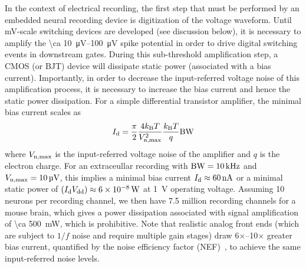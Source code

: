 In the context of electrical recording, the first step that must be performed by an embedded neural recording device is digitization of the voltage waveform.
Until \si{\milli\volt}-scale switching devices are developed (see discussion below), it is necessary to amplify the \SIrange{\ca 10}{100}{\micro\volt} spike potential in order to drive digital switching events in downstream gates.
During this sub-threshold amplification step, a CMOS (or BJT) device will dissipate static power (associated with a bias current). 
Importantly, in order to decrease the input-referred voltage noise of this amplification process, it is necessary to increase the bias current and hence the static power dissipation.
For a simple differential transistor amplifier, the minimal bias current scales as
\[I_{\text{\scriptsize d}} = \frac{\pi}{2} \frac{4k_{\text{\scriptsize B}} T}{V_{\text{\scriptsize n,max}}^2} \frac{k_{\text{\scriptsize B}} T}{q} \text{BW}\]
where $V_{\text{\scriptsize n,max}}$ is the input-referred voltage noise of the amplifier and $q$ is the electron charge.
For an extraceullar recording with $\text{BW} = \SI{10}{\kilo\hertz}$ and $V_{\text{\scriptsize n,max}} = \SI{10}{\micro\volt}$, this implies a minimal bias current $I_{\text{\scriptsize d}}\approx\SI{60}{\nano\ampere}$ or a minimal static power of $\left(I_{\text{\scriptsize d}} V_{\text{\scriptsize dd}}\right)\approx\SI{6e-8}{\watt}$ at \SI{1}{\volt} operating voltage.
Assuming 10 neurons per recording channel, we then have 7.5 million recording channels for a mouse brain, which gives a power dissipation associated with signal amplification of \SI{\ca 500}{\milli\watt}, which is prohibitive.
Note that realistic analog front ends (which are subject to $1/f$ noise and require multiple gain stages) draw 6$\times$--10$\times$ greater bias current, quantified by the noise efficiency factor (NEF)~\cite{steyaert87}, to achieve the same input-referred noise levels.

